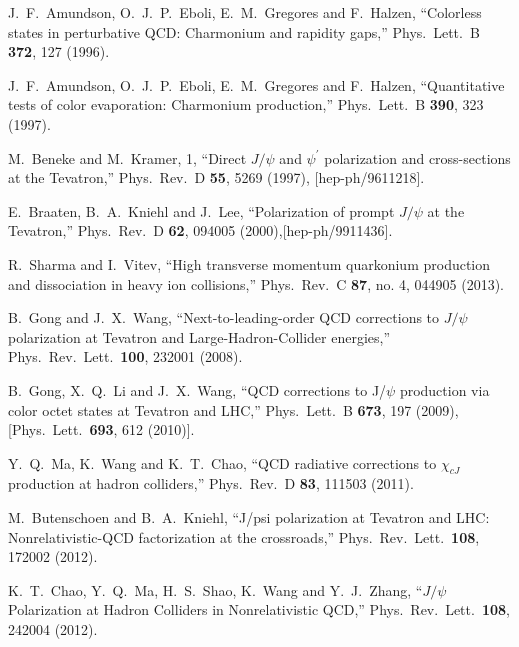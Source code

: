\documentclass[12pt,a4paper,final]{iopart}
\begin{document}
\begin{thebibliography}{100}
  J.~F.~Amundson, O.~J.~P.~Eboli, E.~M.~Gregores and F.~Halzen,
  ``Colorless states in perturbative QCD: Charmonium and rapidity gaps,''
  Phys.\ Lett.\ B {\bf 372}, 127 (1996).


  J.~F.~Amundson, O.~J.~P.~Eboli, E.~M.~Gregores and F.~Halzen,
  ``Quantitative tests of color evaporation: Charmonium production,''
  Phys.\ Lett.\ B {\bf 390}, 323 (1997).


  M.~Beneke and M.~Kramer, 1,
  ``Direct $J/\psi$ and $\psi^\prime$ polarization and cross-sections at the Tevatron,''
  Phys.\ Rev.\ D {\bf 55}, 5269 (1997), [hep-ph/9611218].


  E.~Braaten, B.~A.~Kniehl and J.~Lee,
  ``Polarization of prompt $J/\psi$ at the Tevatron,''
  Phys.\ Rev.\ D {\bf 62}, 094005 (2000),[hep-ph/9911436].


  R.~Sharma and I.~Vitev,
  ``High transverse momentum quarkonium production and dissociation in heavy ion collisions,''
  Phys.\ Rev.\ C {\bf 87}, no. 4, 044905 (2013).


  B.~Gong and J.~X.~Wang,
  ``Next-to-leading-order QCD corrections to $J/\psi$ polarization at Tevatron and Large-Hadron-Collider energies,''
  Phys.\ Rev.\ Lett.\  {\bf 100}, 232001 (2008).
  

  B.~Gong, X.~Q.~Li and J.~X.~Wang,
  ``QCD corrections to J/$\psi$ production via color octet states at Tevatron and LHC,''
  Phys.\ Lett.\ B {\bf 673}, 197 (2009),
  [Phys.\ Lett.\  {\bf 693}, 612 (2010)].
  
  Y.~Q.~Ma, K.~Wang and K.~T.~Chao,
  ``QCD radiative corrections to $\chi_{cJ}$ production at hadron colliders,''
  Phys.\ Rev.\ D {\bf 83}, 111503 (2011).


  M.~Butenschoen and B.~A.~Kniehl,
  ``J/psi polarization at Tevatron and LHC: Nonrelativistic-QCD factorization at the crossroads,''
  Phys.\ Rev.\ Lett.\  {\bf 108}, 172002 (2012).
  
  K.~T.~Chao, Y.~Q.~Ma, H.~S.~Shao, K.~Wang and Y.~J.~Zhang,
  ``$J/\psi$ Polarization at Hadron Colliders in Nonrelativistic QCD,''
  Phys.\ Rev.\ Lett.\  {\bf 108}, 242004 (2012).
  

\end{thebibliography}
\end{document}

